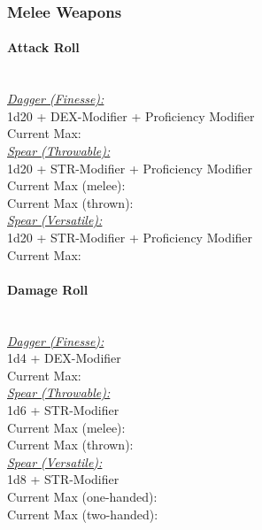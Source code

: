 \documentclass[letterpaper,openany,oneside,twocolumn]{book}
\begin{document}
\subsubsection*{Melee Weapons}
\paragraph*{Attack Roll}\hfill\\
\underline{\textit{Dagger (Finesse):}}\\
1d20 + DEX-Modifier + Proficiency Modifier\\
\indent Current Max: 
\\
\underline{\textit{Spear (Throwable):}}\\
1d20 + STR-Modifier + Proficiency Modifier\\
\indent Current Max (melee): \\
\indent Current Max (thrown): 
\\
\underline{\textit{Spear (Versatile):}}\\
1d20 + STR-Modifier + Proficiency Modifier\\
\indent Current Max: 
\paragraph*{Damage Roll}\hfill\\
\underline{\textit{Dagger (Finesse):}}\\
1d4 + DEX-Modifier\\
\indent Current Max: 
\\
\underline{\textit{Spear (Throwable):}}\\
1d6 + STR-Modifier\\
\indent Current Max (melee): \\
\indent Current Max (thrown): 
\\
\underline{\textit{Spear (Versatile):}}\\
1d8 + STR-Modifier\\
\indent Current Max (one-handed): \\
\indent Current Max (two-handed): 
\end{document}
